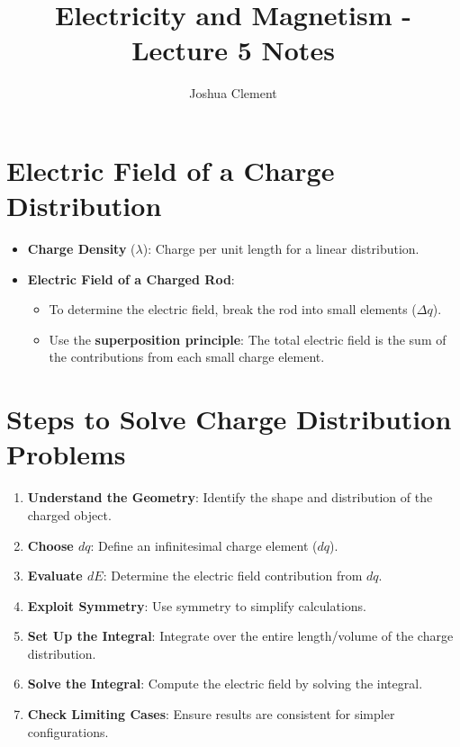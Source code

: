 \documentclass{article}
\begin{document}
\title{Electricity and Magnetism - Lecture 5 Notes}
\author{Joshua Clement}
\maketitle

\section*{Electric Field of a Charge Distribution}
\begin{itemize}
    \item \textbf{Charge Density} (\(\lambda\)): Charge per unit length for a linear distribution.
    \item \textbf{Electric Field of a Charged Rod}:
    \begin{itemize}
        \item To determine the electric field, break the rod into small elements (\(\Delta q\)).
        \item Use the \textbf{superposition principle}: The total electric field is the sum of the contributions from each small charge element.
    \end{itemize}
\end{itemize}

\section*{Steps to Solve Charge Distribution Problems}
\begin{enumerate}
    \item \textbf{Understand the Geometry}: Identify the shape and distribution of the charged object.
    \item \textbf{Choose \(dq\)}: Define an infinitesimal charge element (\(dq\)).
    \item \textbf{Evaluate \(dE\)}: Determine the electric field contribution from \(dq\).
    \item \textbf{Exploit Symmetry}: Use symmetry to simplify calculations.
    \item \textbf{Set Up the Integral}: Integrate over the entire length/volume of the charge distribution.
    \item \textbf{Solve the Integral}: Compute the electric field by solving the integral.
    \item \textbf{Check Limiting Cases}: Ensure results are consistent for simpler configurations.
\end{enumerate}
\end{document}
